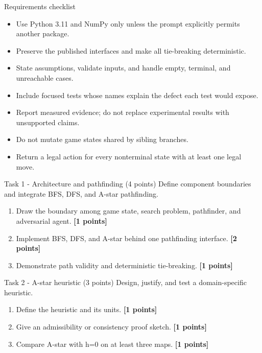 \documentclass[aspectratio=169,11pt]{beamer}
\begin{document}
\begin{frame}{Requirements checklist}
\small
\begin{itemize}
  \item Use Python 3.11 and NumPy only unless the prompt explicitly permits another package.
  \item Preserve the published interfaces and make all tie-breaking deterministic.
  \item State assumptions, validate inputs, and handle empty, terminal, and unreachable cases.
  \item Include focused tests whose names explain the defect each test would expose.
  \item Report measured evidence; do not replace experimental results with unsupported claims.
  \item Do not mutate game states shared by sibling branches.
  \item Return a legal action for every nonterminal state with at least one legal move.
\end{itemize}
\end{frame}

\begin{frame}{Task 1 - Architecture and pathfinding (4 points)}
\small
Define component boundaries and integrate BFS, DFS, and A-star pathfinding.

\vspace{0.2cm}
\begin{enumerate}
\item[\textbf{a.}] Draw the boundary among game state, search problem, pathfinder, and adversarial agent. \hfill{\color{courseblue}\textbf{[1 points]}}
\item[\textbf{b.}] Implement BFS, DFS, and A-star behind one pathfinding interface. \hfill{\color{courseblue}\textbf{[2 points]}}
\item[\textbf{c.}] Demonstrate path validity and deterministic tie-breaking. \hfill{\color{courseblue}\textbf{[1 points]}}
\end{enumerate}
\end{frame}

\begin{frame}{Task 2 - A-star heuristic (3 points)}
\small
Design, justify, and test a domain-specific heuristic.

\vspace{0.2cm}
\begin{enumerate}
\item[\textbf{a.}] Define the heuristic and its units. \hfill{\color{courseblue}\textbf{[1 points]}}
\item[\textbf{b.}] Give an admissibility or consistency proof sketch. \hfill{\color{courseblue}\textbf{[1 points]}}
\item[\textbf{c.}] Compare A-star with h=0 on at least three maps. \hfill{\color{courseblue}\textbf{[1 points]}}
\end{enumerate}
\end{frame}
\end{document}
